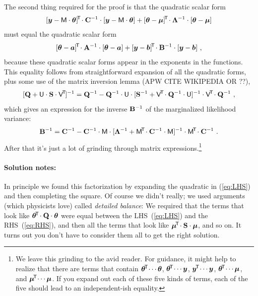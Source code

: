 The second thing required for the proof is that the quadratic scalar form
\begin{equation}\label{eq:LHS}
[\boldsymbol{y}-\mathsf{M}\cdot\boldsymbol{\theta}]^{\!\mathsf{T}\!}\cdot\mathbf{C}^{-1}\cdot[\boldsymbol{y}-\mathsf{M}\cdot\boldsymbol{\theta}]
+ [\boldsymbol{\theta}-\boldsymbol{\mu}]^{\!\mathsf{T}\!}\cdot\mathbf{\Lambda}^{-1}\cdot[\boldsymbol{\theta}-\boldsymbol{\mu}]
\end{equation}
must equal the quadratic scalar form
\begin{equation}\label{eq:RHS}
[\boldsymbol{\theta}-\boldsymbol{a}]^{\!\mathsf{T}\!}\cdot\mathbf{A}^{-1}\cdot[\boldsymbol{\theta}-\boldsymbol{a}]
+ [\boldsymbol{y}-\boldsymbol{b}]^{\!\mathsf{T}\!}\cdot\mathbf{B}^{-1}\cdot[\boldsymbol{y}-\boldsymbol{b}]
~,
\end{equation}
because these quadratic scalar forms appear in the exponents in the functions.
This equality follows from straightforward expansion of
all the quadratic forms, plus some use of the matrix inversion lemma
(APW CITE WIKIPEDIA OR ??),
\begin{equation}\label{eq:invlemma}
[\mathbf{Q} + \mathsf{U}\cdot\mathbf{S}\cdot\mathsf{V}^{\!\mathsf{T}\!}]^{-1} = \mathbf{Q}^{-1} - \mathbf{Q}^{-1}\cdot\mathsf{U}\cdot[\mathbf{S}^{-1} + \mathsf{V}^{\!\mathsf{T}\!}\cdot\mathbf{Q}^{-1}\cdot\mathsf{U}]^{-1}\cdot\mathsf{V}^{\!\mathsf{T}\!}\cdot\mathbf{Q}^{-1}
~,
\end{equation}
which gives an expression for the inverse $\mathbf{B}^{-1}$ of the marginalized
likelihood variance:
\begin{equation}
\mathbf{B}^{-1} = \mathbf{C}^{-1} - \mathbf{C}^{-1}\cdot\mathsf{M}\cdot[\mathbf{\Lambda}^{-1} + \mathsf{M}^{\!\mathsf{T}\!}\cdot\mathbf{C}^{-1}\cdot\mathsf{M}]^{-1}\cdot\mathsf{M}^{\!\mathsf{T}\!}\cdot\mathbf{C}^{-1}
~.
\end{equation}
After that it's just a lot of grinding through matrix expressions.\footnote{%
We leave this grinding to the avid reader.
For guidance, it might help to realize that there are terms that
contain $\boldsymbol{\theta}^{\!\mathsf{T}\!}\cdots\boldsymbol{\theta}$, $\boldsymbol{\theta}^{\!\mathsf{T}\!}\cdots\boldsymbol{y}$, $\boldsymbol{y}^{\!\mathsf{T}\!}\cdots\boldsymbol{y}$,
$\boldsymbol{\theta}^{\!\mathsf{T}\!}\cdots\boldsymbol{\mu}$, and $\boldsymbol{\mu}^{\!\mathsf{T}\!}\cdots\boldsymbol{\mu}$.
If you expand out each of these five kinds of terms, each of the five
should lead to an independent-ish equality.}

\paragraph{Solution notes:}
In principle we found this factorization by expanding the quadratic in
(\ref{eq:LHS}) and then completing the square.
Of course we didn't really; we used arguments (which physicists love)
called \emph{detailed balance}:
We required that the terms that look like
$\boldsymbol{\theta}^{\!\mathsf{T}\!}\cdot\mathbf{Q}\cdot\boldsymbol{\theta}$ were equal between the LHS~(\ref{eq:LHS})
and the RHS~(\ref{eq:RHS}), and then all the terms that look like
$\boldsymbol{\mu}^{\!\mathsf{T}\!}\cdot\mathbf{S}\cdot\boldsymbol{\mu}$, and so on.
It turns out you don't have to consider them all to get the right solution.

